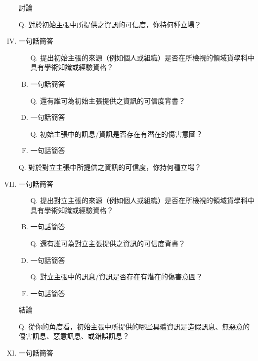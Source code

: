 \documentclass[a4paper, 12pt]{article}
\begin{document}
\begin{enumerate}[I.]
    \item [] %
    \item [] 討論
    \item [Q.] 對於{\color{blue}初始主張}中所提供之資訊的可信度，你持何種立場？
    \item {\color{gray}一句話簡答} %
          \begin{enumerate}[A.]
              \item [Q.]提出{\color{blue}初始主張}的來源（例如個人或組織）是否在所檢視的領域貨學科中具有學術知識或經驗資格？
              \item {\color{gray}一句話簡答} %
              \item [Q.]還有誰可為{\color{blue}初始主張}提供之資訊的可信度背書？
              \item {\color{gray}一句話簡答}
              \item [Q.]{\color{blue}初始主張}中的訊息/資訊是否存在有潛在的傷害意圖？
              \item {\color{gray}一句話簡答}
          \end{enumerate}
    \item []
    \item [Q.] 對於{\color{red}對立主張}中所提供之資訊的可信度，你持何種立場？
    \item {\color{gray}一句話簡答} %
          \begin{enumerate}[A.]
              \item [Q.]提出{\color{red}對立主張}的來源（例如個人或組織）是否在所檢視的領域貨學科中具有學術知識或經驗資格？
              \item {\color{gray}一句話簡答} %
              \item [Q.]還有誰可為{\color{red}對立主張}提供之資訊的可信度背書？
              \item {\color{gray}一句話簡答}
              \item [Q.]{\color{red}對立主張}中的訊息/資訊是否存在有潛在的傷害意圖？
              \item {\color{gray}一句話簡答}
          \end{enumerate}
    \item [] %
    \item [] 結論
    \item [Q.] 從你的角度看，{\color{blue}初始主張}中所提供的哪些具體資訊是造假訊息、無惡意的傷害訊息、惡意訊息、或錯誤訊息？
    \item {\color{gray}一句話簡答} %

\end{enumerate}
\end{document}

